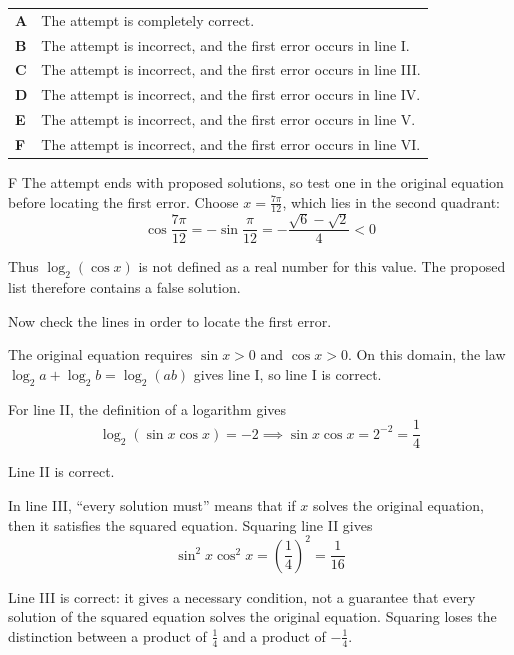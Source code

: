 \documentclass[11pt,a4paper]{article}
\begin{document}
\begin{enumerate}[label=\textbf{\arabic*.},leftmargin=*,itemsep=0pt,start=12]
\par\vspace*{12pt}
\begin{tabularx}{\linewidth}{@{}>{\bfseries}l Y@{}}
A &
The attempt is completely correct.
\\[0.8em]
B &
The attempt is incorrect, and the first error occurs in line I.
\\[0.8em]
C &
The attempt is incorrect, and the first error occurs in line III.
\\[0.8em]
D &
The attempt is incorrect, and the first error occurs in line IV.
\\[0.8em]
E &
The attempt is incorrect, and the first error occurs in line V.
\\[0.8em]
F &
The attempt is incorrect, and the first error occurs in line VI.
\\
\end{tabularx}

\begin{djsSolution}{F}
The attempt ends with proposed solutions, so test one in the original equation before locating the first error. Choose $x=\frac{7\pi}{12}$, which lies in the second quadrant:
\[
\cos\frac{7\pi}{12}=-\sin\frac{\pi}{12}=-\frac{\sqrt6-\sqrt2}{4}<0
\]

Thus $\log_2(\cos x)$ is not defined as a real number for this value. The proposed list therefore contains a false solution.

Now check the lines in order to locate the first error.

The original equation requires $\sin x>0$ and $\cos x>0$. On this domain, the law $\log_2 a+\log_2 b=\log_2(ab)$ gives line I, so line I is correct.

For line II, the definition of a logarithm gives
\[
\log_2(\sin x\cos x)=-2
\implies \sin x\cos x=2^{-2}=\frac14
\]

Line II is correct.

In line III, ``every solution must'' means that if $x$ solves the original equation, then it satisfies the squared equation. Squaring line II gives
\[
\sin^2x\cos^2x=\left(\frac14\right)^2=\frac1{16}
\]

Line III is correct: it gives a necessary condition, not a guarantee that every solution of the squared equation solves the original equation. Squaring loses the distinction between a product of $\frac14$ and a product of $-\frac14$.


\end{djsSolution}
\end{enumerate}
\end{document}
